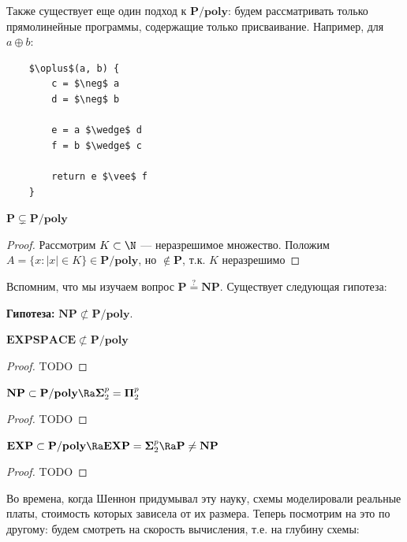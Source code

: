 Также существует еще один подход к \(\mathbf{P/poly}\): будем рассматривать только прямолинейные программы, содержащие только присваивание. Например, для \(a \oplus b\):

\begin{lstlisting}
    $\oplus$(a, b) {
        c = $\neg$ a
        d = $\neg$ b

        e = a $\wedge$ d
        f = b $\wedge$ c

        return e $\vee$ f
    }
\end{lstlisting}

\begin{theorem}
    \(\mathbf{P} \subsetneq \mathbf{P/poly}\)
\end{theorem}
\begin{proof}
    Рассмотрим \(K \subset \N\) --- неразрешимое множество. Положим \(A = \{x: |x| \in K\} \in \mathbf{P/poly}\), но \(\notin \mathbf{P}\), т.к. \(K\) неразрешимо
\end{proof}

Вспомним, что мы изучаем вопрос \(\mathbf{P} \stackrel{?}{=} \mathbf{NP}\). Существует следующая гипотеза:

\textbf{Гипотеза:} \(\mathbf{NP} \not\subset \mathbf{P/poly}\). 

\begin{theorem}
    \(\mathbf{EXPSPACE} \not\subset \mathbf{P/poly}\)
\end{theorem}
\begin{proof}
    TODO
\end{proof}

\begin{theorem}
    \(\mathbf{NP} \subset \mathbf{P/poly} \Ra \mathbf{\Sigma}_2^p = \mathbf{\Pi}_2^p\)
\end{theorem}
\begin{proof}
    TODO
\end{proof}

\begin{theorem}
    \(\mathbf{EXP} \subset \mathbf{P/poly} \Ra \mathbf{EXP} = \mathbf{\Sigma}_2^p \Ra \mathbf{P} \ne \mathbf{NP}\)
\end{theorem}
\begin{proof}
    TODO
\end{proof}

Во времена, когда Шеннон придумывал эту науку, схемы моделировали реальные платы, стоимость которых зависела от их размера. Теперь посмотрим на это по другому: будем смотреть на скорость вычисления, т.е. на глубину схемы:

